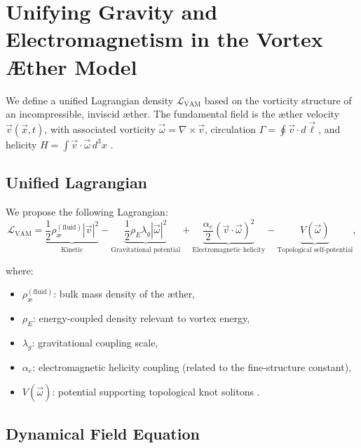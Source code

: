 \section{Unifying Gravity and Electromagnetism in the Vortex \AE ther Model}

We define a unified Lagrangian density \( \mathcal{L}_\text{VAM} \) based on the vorticity structure of an incompressible, inviscid æther. The fundamental field is the æther velocity \( \vec{v}(\vec{x}, t) \), with associated vorticity \( \vec{\omega} = \nabla \times \vec{v} \), circulation \( \Gamma = \oint \vec{v} \cdot d\vec{\ell} \), and helicity \( H = \int \vec{v} \cdot \vec{\omega} \, d^3x \) \cite{moffatt1969degree, arnold1998topological}.

\subsection*{Unified Lagrangian}

We propose the following Lagrangian:
\begin{equation}
\label{eq:L_VAM}
\mathcal{L}_\text{VAM} =
\underbrace{\frac{1}{2} \rho_\text{\ae}^{(\text{fluid})} |\vec{v}|^2}_{\text{Kinetic}} -
\underbrace{\frac{1}{2} \rho_{\scriptscriptstyle\boldsymbol\!E}\lambda_g |\vec{\omega}|^2}_{\text{Gravitational potential}} +
\underbrace{\frac{\alpha_e}{2} (\vec{v} \cdot \vec{\omega})^2}_{\text{Electromagnetic helicity}} -
\underbrace{V(\vec{\omega})}_{\text{Topological self-potential}},
\end{equation}

where:
\begin{itemize}
    \item \( \rho_\text{\ae}^{(\text{fluid})} \): bulk mass density of the æther,
    \item \( \rho_{\scriptscriptstyle\boldsymbol\!E}\): energy-coupled density relevant to vortex energy,
    \item \( \lambda_g \): gravitational coupling scale,
    \item \( \alpha_e \): electromagnetic helicity coupling (related to the fine-structure constant),
    \item \( V(\vec{\omega}) \): potential supporting topological knot solitons \cite{faddeev1997stable, babaev2002knotted}.
\end{itemize}

\subsection*{Dynamical Field Equation}

